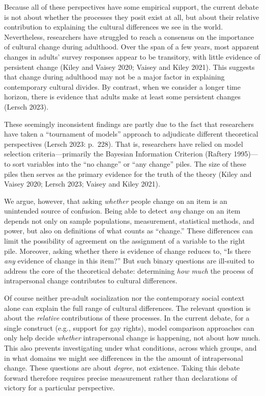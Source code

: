 \documentclass[
  12pt,
]{article}
\begin{document}
Because all of these perspectives have some empirical support, the
current debate is not about whether the processes they posit exist at
all, but about their relative contribution to explaining the cultural
differences we see in the world. Nevertheless, researchers have
struggled to reach a consensus on the importance of cultural change
during adulthood. Over the span of a few years, most apparent changes in
adults' survey responses appear to be transitory, with little evidence
of persistent change (Kiley and Vaisey 2020; Vaisey and Kiley 2021).
This suggests that change during adulthood may not be a major factor in
explaining contemporary cultural divides. By contrast, when we consider
a longer time horizon, there is evidence that adults make at least some
persistent changes (Lersch 2023).

These seemingly inconsistent findings are partly due to the fact that
researchers have taken a ``tournament of models'' approach to adjudicate
different theoretical perspectives (Lersch 2023: p.~228). That is,
researchers have relied on model selection criteria---primarily the
Bayesian Information Criterion (Raftery 1995)---to sort variables into
the ``no change'' or ``any change'' piles. The size of these piles then
serves as the primary evidence for the truth of the theory (Kiley and
Vaisey 2020; Lersch 2023; Vaisey and Kiley 2021).

We argue, however, that asking \emph{whether} people change on an item
is an unintended source of confusion. Being able to detect \emph{any}
change on an item depends not only on sample populations, measurement,
statistical methods, and power, but also on definitions of what counts
as ``change.'' These differences can limit the possibility of agreement
on the assignment of a variable to the right pile. Moreover, asking
whether there is evidence of change reduces to, ``Is there \emph{any}
evidence of change in this item?'' But such binary questions are
ill-suited to address the core of the theoretical debate: determining
\emph{how much} the process of intrapersonal change contributes to
cultural differences.

Of course neither pre-adult socialization nor the contemporary social
context alone can explain the full range of cultural differences. The
relevant question is about the \emph{relative} contributions of these
processes. In the current debate, for a single construct (e.g., support
for gay rights), model comparison approaches can only help decide
\emph{whether} intrapersonal change is happening, not about how much.
This also prevents investigating under what conditions, across which
groups, and in what domains we might see differences in the the amount
of intrapersonal change. These questions are about \emph{degree}, not
existence. Taking this debate forward therefore requires precise
measurement rather than declarations of victory for a particular
perspective.
\end{document}
